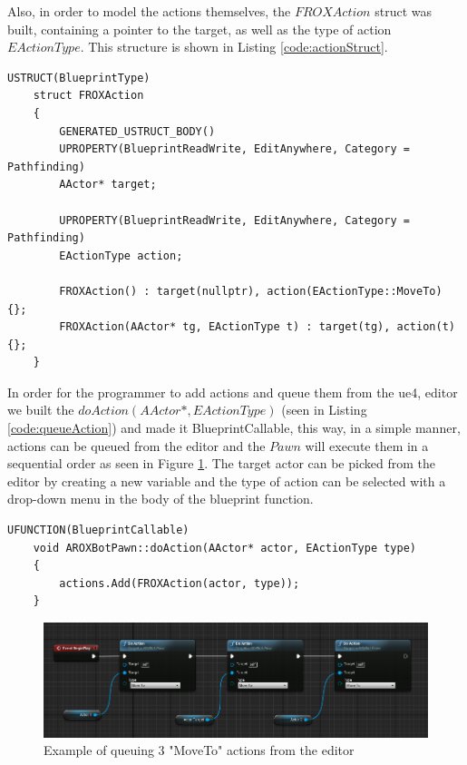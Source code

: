 Also, in order to model the actions themselves, the $FROXAction$ struct was built, containing a pointer to the target, as well as the type of action $EActionType$. This structure is shown in Listing \ref{code:actionStruct}.

\begin{lstlisting}[style=C++, caption=FROXAction struct, frame=single, label=code:actionStruct]
	USTRUCT(BlueprintType)
	struct FROXAction
	{
		GENERATED_USTRUCT_BODY()
		UPROPERTY(BlueprintReadWrite, EditAnywhere, Category = Pathfinding)
		AActor* target;
		
		UPROPERTY(BlueprintReadWrite, EditAnywhere, Category = Pathfinding)
		EActionType action;
		
		FROXAction() : target(nullptr), action(EActionType::MoveTo) {};
		FROXAction(AActor* tg, EActionType t) : target(tg), action(t) {};
	}
\end{lstlisting}

In order for the programmer to add actions and queue them from the \gls{ue4}, editor we built the $doAction(AActor*, EActionType)$ (seen in Listing \ref{code:queueAction}) and made it BlueprintCallable, this way, in a simple manner, actions can be queued from the editor and the $Pawn$ will execute them in a sequential order as seen in Figure \ref{action_queue}. The target actor can be picked from the editor by creating a new variable and the type of action can be selected with a drop-down menu in the body of the blueprint function.

\begin{lstlisting}[style=C++, caption=doAction function which queues a new FROXAction to the system, frame=single, label=code:queueAction]
	UFUNCTION(BlueprintCallable)
	void AROXBotPawn::doAction(AActor* actor, EActionType type) 
	{	
		actions.Add(FROXAction(actor, type));
	}
\end{lstlisting}

\begin{figure}[!ht]
	\includegraphics[scale=0.4]{archivos/action_queue.png}
	\centering
	\caption{Example of queuing 3 "MoveTo" actions from the editor}
	\label{action_queue}
\end{figure}

